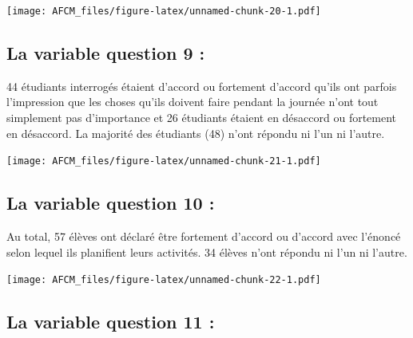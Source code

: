 \documentclass[
]{article}
\newenvironment{Shaded}{\begin{snugshade}}{\end{snugshade}}
\newcommand{\FunctionTok}[1]{\textcolor[rgb]{0.00,0.00,0.00}{#1}}
\newcommand{\NormalTok}[1]{#1}
\newcommand{\SpecialCharTok}[1]{\textcolor[rgb]{0.00,0.00,0.00}{#1}}
\newcommand{\StringTok}[1]{\textcolor[rgb]{0.31,0.60,0.02}{#1}}
\begin{document}
\texttt{[image: AFCM\_files/figure-latex/unnamed-chunk-20-1.pdf]}

\hypertarget{la-variable-question-9}{%
\subsection{La variable question 9 :}\label{la-variable-question-9}}

44 étudiants interrogés étaient d'accord ou fortement d'accord qu'ils
ont parfois l'impression que les choses qu'ils doivent faire pendant la
journée n'ont tout simplement pas d'importance et 26 étudiants étaient
en désaccord ou fortement en désaccord. La majorité des étudiants (48)
n'ont répondu ni l'un ni l'autre.

\begin{Shaded}
\end{Shaded}

\texttt{[image: AFCM\_files/figure-latex/unnamed-chunk-21-1.pdf]}

\hypertarget{la-variable-question-10}{%
\subsection{La variable question 10 :}\label{la-variable-question-10}}

Au total, 57 élèves ont déclaré être fortement d'accord ou d'accord avec
l'énoncé selon lequel ils planifient leurs activités. 34 élèves n'ont
répondu ni l'un ni l'autre.

\begin{Shaded}
\end{Shaded}

\texttt{[image: AFCM\_files/figure-latex/unnamed-chunk-22-1.pdf]}

\hypertarget{la-variable-question-11}{%
\subsection{La variable question 11 :}\label{la-variable-question-11}}
\end{document}

